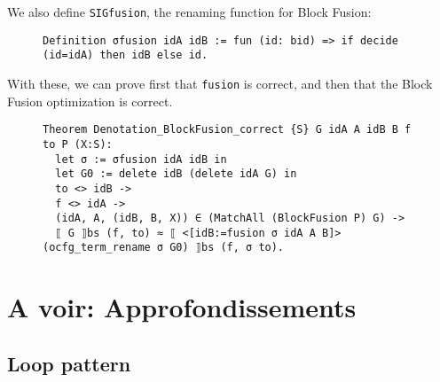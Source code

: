 \documentclass[11pt]{article}
\newcommand{\inlinecoq}[1]{\mbox{\lstinline[style=customcoq,columns=fixed,basewidth=.48em]{#1}}}
\newcommand{\ilc}[1]{\inlinecoq{#1}}
\begin{document}
We also define \ilc{SIGfusion}, the renaming function for Block Fusion:

\begin{figure}
  \begin{lstlisting}[style=customcoq,basicstyle=\small\ttfamily]
Definition σfusion idA idB := fun (id: bid) => if decide (id=idA) then idB else id.
  \end{lstlisting}
\end{figure}

With these, we can prove first that \ilc{fusion} is correct, and then that the Block Fusion optimization is correct.

\begin{figure}
  \begin{lstlisting}[style=customcoq,basicstyle=\small\ttfamily]
Theorem Denotation_BlockFusion_correct {S} G idA A idB B f to P (X:S):
  let σ := σfusion idA idB in
  let G0 := delete idB (delete idA G) in
  to <> idB ->
  f <> idA ->
  (idA, A, (idB, B, X)) ∈ (MatchAll (BlockFusion P) G) ->
  ⟦ G ⟧bs (f, to) ≈ ⟦ <[idB:=fusion σ idA A B]> (ocfg_term_rename σ G0) ⟧bs (f, σ to).
      \end{lstlisting}
\end{figure}

\section{A voir: Approfondissements}
\label{sec:appr}

\subsection{Loop pattern}



\end{document}
